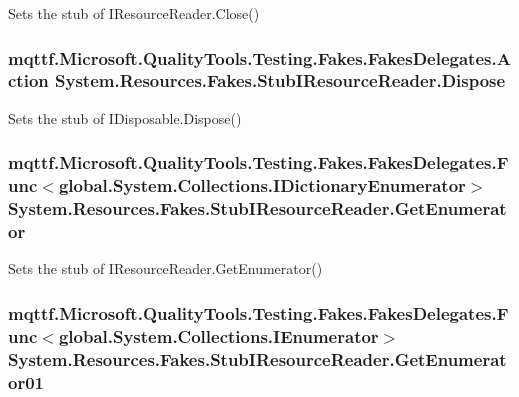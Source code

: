 Sets the stub of I\-Resource\-Reader.\-Close()

\hypertarget{class_system_1_1_resources_1_1_fakes_1_1_stub_i_resource_reader_a2c0fa269110c7d3e7a8ec5d3c3e16066}{
\subsubsection[{Dispose}]{\setlength{\rightskip}{0pt plus 5cm}mqttf.\-Microsoft.\-Quality\-Tools.\-Testing.\-Fakes.\-Fakes\-Delegates.\-Action System.\-Resources.\-Fakes.\-Stub\-I\-Resource\-Reader.\-Dispose}}\label{class_system_1_1_resources_1_1_fakes_1_1_stub_i_resource_reader_a2c0fa269110c7d3e7a8ec5d3c3e16066}


Sets the stub of I\-Disposable.\-Dispose()

\hypertarget{class_system_1_1_resources_1_1_fakes_1_1_stub_i_resource_reader_a323aaeb94e424263a5122a6034e01da1}{
\subsubsection[{Get\-Enumerator}]{\setlength{\rightskip}{0pt plus 5cm}mqttf.\-Microsoft.\-Quality\-Tools.\-Testing.\-Fakes.\-Fakes\-Delegates.\-Func$<$global.\-System.\-Collections.\-I\-Dictionary\-Enumerator$>$ System.\-Resources.\-Fakes.\-Stub\-I\-Resource\-Reader.\-Get\-Enumerator}}\label{class_system_1_1_resources_1_1_fakes_1_1_stub_i_resource_reader_a323aaeb94e424263a5122a6034e01da1}


Sets the stub of I\-Resource\-Reader.\-Get\-Enumerator()

\hypertarget{class_system_1_1_resources_1_1_fakes_1_1_stub_i_resource_reader_a0d2a1dcf008eb8b4f0875bf82da68908}{
\subsubsection[{Get\-Enumerator01}]{\setlength{\rightskip}{0pt plus 5cm}mqttf.\-Microsoft.\-Quality\-Tools.\-Testing.\-Fakes.\-Fakes\-Delegates.\-Func$<$global.\-System.\-Collections.\-I\-Enumerator$>$ System.\-Resources.\-Fakes.\-Stub\-I\-Resource\-Reader.\-Get\-Enumerator01}}\label{class_system_1_1_resources_1_1_fakes_1_1_stub_i_resource_reader_a0d2a1dcf008eb8b4f0875bf82da68908}


